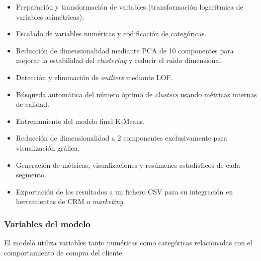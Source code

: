 \documentclass[11pt,a4paper]{article}
\begin{document}
\begin{itemize}
    \item Preparación y transformación de variables (transformación logarítmica de variables asimétricas).
    \item Escalado de variables numéricas y codificación de categóricas.
    \item Reducción de dimensionalidad mediante PCA de 10 componentes para mejorar la estabilidad del \textit{clustering} y reducir el ruido dimensional.
    \item Detección y eliminación de \textit{outliers} mediante LOF.
    \item Búsqueda automática del número óptimo de \textit{clusters} usando métricas internas de calidad.
    \item Entrenamiento del modelo final K-Means.
    \item Reducción de dimensionalidad a 2 componentes exclusivamente para visualización gráfica.
    \item Generación de métricas, visualizaciones y resúmenes estadísticos de cada segmento.
    \item Exportación de los resultados a un fichero CSV para su integración en herramientas de CRM o \textit{marketing}.
\end{itemize}

\subsubsection{Variables del modelo}

El modelo utiliza variables tanto numéricas como categóricas relacionadas con el comportamiento de compra del cliente.
\end{document}

